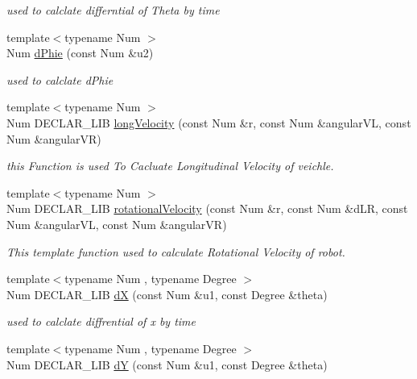 \begin{DoxyCompactItemize}
\begin{DoxyCompactList}\small\item\em used to calclate differntial of Theta by time \end{DoxyCompactList}\item 
{\footnotesize template$<$typename Num $>$ }\\Num \hyperlink{namespace_path_1_1_kinematic_models_a3433ae2dd28c9f7b8b66c42c173ce543}{d\+Phie} (const Num \&u2)
\begin{DoxyCompactList}\small\item\em used to calclate d\+Phie \end{DoxyCompactList}\item 
{\footnotesize template$<$typename Num $>$ }\\Num D\+E\+C\+L\+A\+R\+\_\+\+L\+IB \hyperlink{namespace_path_1_1_kinematic_models_a1d71a0052e6781a914b7734f61ccda59}{long\+Velocity} (const Num \&r, const Num \&angular\+VL, const Num \&angular\+VR)
\begin{DoxyCompactList}\small\item\em this Function is used To Cacluate Longitudinal Velocity of veichle. \end{DoxyCompactList}\item 
{\footnotesize template$<$typename Num $>$ }\\Num D\+E\+C\+L\+A\+R\+\_\+\+L\+IB \hyperlink{namespace_path_1_1_kinematic_models_a12c28f2e1b73152b0f51af632889bc4f}{rotational\+Velocity} (const Num \&r, const Num \&d\+LR, const Num \&angular\+VL, const Num \&angular\+VR)
\begin{DoxyCompactList}\small\item\em This template function used to calculate Rotational Velocity of robot. \end{DoxyCompactList}\item 
{\footnotesize template$<$typename Num , typename Degree $>$ }\\Num D\+E\+C\+L\+A\+R\+\_\+\+L\+IB \hyperlink{namespace_path_1_1_kinematic_models_a28f62881ebe7e125d5039f52b72448b5}{dX} (const Num \&u1, const Degree \&theta)
\begin{DoxyCompactList}\small\item\em used to calclate diffrential of x by time \end{DoxyCompactList}\item 
{\footnotesize template$<$typename Num , typename Degree $>$ }\\Num D\+E\+C\+L\+A\+R\+\_\+\+L\+IB \hyperlink{namespace_path_1_1_kinematic_models_a872e84d8a115db786624f3fc8e6790a4}{dY} (const Num \&u1, const Degree \&theta)

\end{DoxyCompactItemize}
